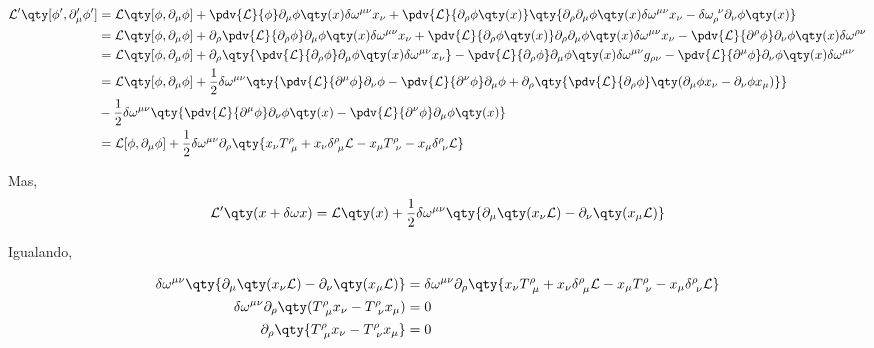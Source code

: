 \documentclass[twoside]{amsart}
\numberwithin{equation}{section}
\begin{document}
\begin{align}
    \mathcal L'\qty[\phi',\partial_\mu'\phi']&=\mathcal L\qty[\phi,\partial_\mu\phi]+\pdv{\mathcal L}{\phi}\partial_\mu\phi\qty(x)\delta\omega^{\mu\nu}x_\nu+\pdv{\mathcal L}{\partial_\rho\phi\qty(x)}\qty{\partial_\rho\partial_\mu\phi\qty(x)\delta\omega^{\mu\nu}x_\nu-\delta\omega_{\rho}^{\ \nu}\partial_\nu\phi\qty(x)}\\
    &=\mathcal L\qty[\phi,\partial_\mu\phi]+\partial_\rho\pdv{\mathcal L}{\partial_\rho\phi}\partial_\mu\phi\qty(x)\delta\omega^{\mu\nu}x_\nu+\pdv{\mathcal L}{\partial_\rho\phi\qty(x)}\partial_\rho\partial_\mu\phi\qty(x)\delta\omega^{\mu\nu}x_\nu-\pdv{\mathcal L}{\partial^\rho\phi}\partial_\nu\phi\qty(x)\delta\omega^{\rho\nu}\\
    &=\mathcal L\qty[\phi,\partial_\mu\phi]+\partial_\rho\qty{\pdv{\mathcal L}{\partial_\rho\phi}\partial_\mu\phi\qty(x)\delta\omega^{\mu\nu}x_\nu}-\pdv{\mathcal L}{\partial_\rho\phi}\partial_\mu\phi\qty(x)\delta\omega^{\mu\nu}g_{\rho\nu}-\pdv{\mathcal L}{\partial^\mu\phi}\partial_\nu\phi\qty(x)\delta\omega^{\mu\nu}\\
    &=\mathcal L\qty[\phi,\partial_\mu\phi]+\frac12\delta\omega^{\mu\nu}\qty{\pdv{\mathcal L}{\partial^\mu\phi}\partial_\nu\phi-\pdv{\mathcal L}{\partial^\nu\phi}\partial_\mu\phi+\partial_\rho\qty{\pdv{\mathcal L}{\partial_\rho\phi}\qty(\partial_\mu\phi x_\nu-\partial_\nu\phi x_\mu)}}\\
    &-\frac12\delta\omega^{\mu\nu}\qty{\pdv{\mathcal L}{\partial^\mu\phi}\partial_\nu\phi\qty(x)-\pdv{\mathcal L}{\partial^\nu\phi}\partial_\mu\phi\qty(x)}\\
    &=\mathcal L[\phi,\partial_\mu\phi]+\frac12\delta\omega^{\mu\nu}\partial_\rho\qty{x_\nu T^\rho_{\ \mu}+x_\nu\delta^\rho_{\ \mu}\mathcal L-x_\mu T^\rho_{\ \nu}-x_\mu\delta^\rho_{\ \nu}\mathcal L}
\end{align}

Mas, $$\mathcal L'\qty(x+\delta\omega x)=\mathcal L\qty(x)+\frac12\delta\omega^{\mu\nu}\qty{\partial_\mu\qty(x_\nu\mathcal L)-\partial_\nu\qty(x_\mu\mathcal L)}$$

Igualando,

\begin{align}
    \delta\omega^{\mu\nu}\qty{\partial_\mu\qty(x_\nu\mathcal L)-\partial_\nu\qty(x_\mu\mathcal L)}&=\delta\omega^{\mu\nu}\partial_\rho\qty{x_\nu T^\rho_{\ \mu}+x_\nu\delta^\rho_{\ \mu}\mathcal L-x_\mu T^\rho_{\ \nu}-x_\mu\delta^\rho_{\ \nu}\mathcal L}\\
    \delta\omega^{\mu\nu}\partial_\rho\qty(T^\rho_{\ \mu}x_\nu-T^\rho_{\ \nu}x_\mu)&=0\\
    \partial_\rho\qty{T^\rho_{\ \mu}x_\nu-T^\rho_{\ \nu}x_\mu}&=0
\end{align}
\end{document}
